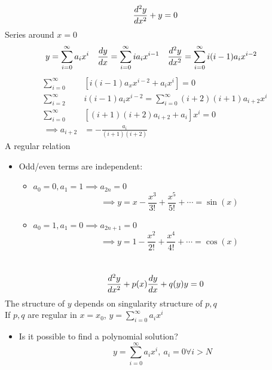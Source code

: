 \documentclass[Maths.tex]{subfiles}
\begin{document}
\begin{example}
\begin{equation*}
    \frac{d^2 y}{dx^2} + y = 0
\end{equation*}
Series around $x=0$
\begin{align*}
    y &= \sum_{i=0}^\infty a_ix^i & \frac{dy}{dx} &= \sum_{i=0}^\infty ia_ix^{i-1} & \frac{d^2 y}{dx^2} &= \sum_{i=0}^\infty i(i-1)a_ix^{i-2}
\end{align*}
\begin{align*}
    \sum_{i=0}^\infty &\left[i(i-1)a_xx^{i-2} + a_ix^i\right] = 0 \\
    \sum_{i=2}^\infty &i(i-1)a_ix^{i-2} = \sum_{i=0}^\infty (i+2)(i+1)a_{i+2}x^i \\
    \sum_{i=0}^\infty &\left[(i+1)(i+2)a_{i+2}+ a_i\right]x^i = 0 \\
    \implies a_{i+2} &= -\frac{a_i}{(i+1)(i+2)}
\end{align*}
A regular relation
\begin{itemize}
    \item Odd/even terms are independent:
    \begin{itemize}
        \item $a_0 = 0, a_1 = 1 \implies a_{2n} = 0$
        \begin{equation*}
            \implies y = x - \frac{x^3}{3!} + \frac{x^5}{5!} + \cdots = \sin(x)
        \end{equation*}
        \item $a_0 = 1, a_1 = 0 \implies a_{2n+1} = 0$
        \begin{equation*}
            \implies y = 1 - \frac{x^2}{2!} + \frac{x^4}{4!} + \cdots = \cos(x)
        \end{equation*}
    \end{itemize}
\end{itemize}
\end{example}

\chapter{}
\begin{equation*}
    \frac{d^2 y}{dx^2} + p(x)\frac{dy}{dx} + q(y)y = 0
\end{equation*}
The structure of $y$ depends on singularity structure of $p,q$ \\
If $p,q$ are regular in $x=x_0$, $y = \sum_{i=0}^\infty a_ix^i$

\begin{itemize}
    \item Is it possible to find a polynomial solution?
    \begin{equation*}
        y = \sum_{i=0}^\infty a_ix^i,~ a_i = 0 \forall i > N
    \end{equation*}
\end{itemize}
\end{document}
